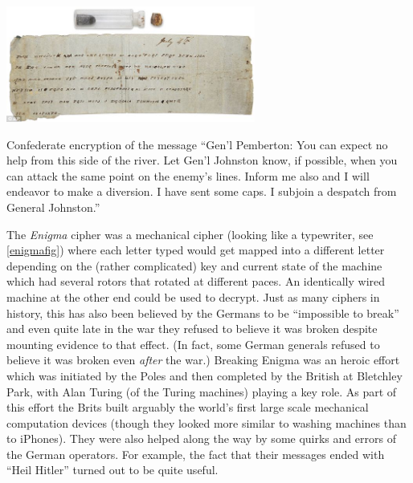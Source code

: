 \begin{marginfigure}
\centering
\includegraphics[width=\linewidth, height=1.5in, keepaspectratio]{../figure/confederate_message.jpg}
\caption{Confederate encryption of the message ``Gen'l Pemberton: You
can expect no help from this side of the river. Let Gen'l Johnston know,
if possible, when you can attack the same point on the enemy's lines.
Inform me also and I will endeavor to make a diversion. I have sent some
caps. I subjoin a despatch from General Johnston.''}
\label{tmplabelfig}
\end{marginfigure}

The \emph{Enigma} cipher was a mechanical cipher (looking like a
typewriter, see \cref{enigmafig}) where each letter typed would get
mapped into a different letter depending on the (rather complicated) key
and current state of the machine which had several rotors that rotated
at different paces. An identically wired machine at the other end could
be used to decrypt. Just as many ciphers in history, this has also been
believed by the Germans to be ``impossible to break'' and even quite
late in the war they refused to believe it was broken despite mounting
evidence to that effect. (In fact, some German generals refused to
believe it was broken even \emph{after} the war.) Breaking Enigma was an
heroic effort which was initiated by the Poles and then completed by the
British at Bletchley Park, with Alan Turing (of the Turing machines)
playing a key role. As part of this effort the Brits built arguably the
world's first large scale mechanical computation devices (though they
looked more similar to washing machines than to iPhones). They were also
helped along the way by some quirks and errors of the German operators.
For example, the fact that their messages ended with ``Heil Hitler''
turned out to be quite useful.



